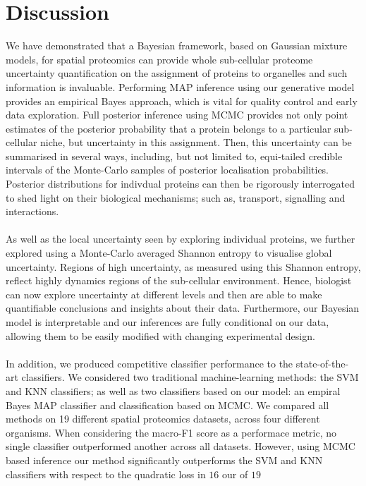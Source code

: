 \documentclass[12pt,english]{article}\usepackage[]{graphicx}\usepackage[]{color}
\begin{document}
\section{Discussion}

We have demonstrated that a Bayesian framework, based on Gaussian
mixture models, for spatial proteomics can provide whole sub-cellular
proteome uncertainty quantification on the assignment of proteins to
organelles and such information is invaluable. Performing MAP
inference using our generative model provides an empirical Bayes
approach, which is vital for quality control and early data
exploration. Full posterior inference using MCMC provides not only
point estimates of the posterior probability that a protein belongs to
a particular sub-cellular niche, but uncertainty in this
assignment. Then, this uncertainty can be summarised in several ways,
including, but not limited to, equi-tailed credible intervals of the
Monte-Carlo samples of posterior localisation probabilities.
Posterior distributions for indivdual proteins can then be rigorously
interrogated to shed light on their biological mechanisms; such as,
transport, signalling and interactions.
\\
\\
As well as the local uncertainty seen by exploring individual
proteins, we further explored using a Monte-Carlo averaged Shannon
entropy to visualise global uncertainty. Regions of high uncertainty,
as measured using this Shannon entropy, reflect highly dynamics
regions of the sub-cellular environment.  Hence, biologist can now
explore uncertainty at different levels and then are able to make
quantifiable conclusions and insights about their data.  Furthermore,
our Bayesian model is interpretable and our inferences are fully
conditional on our data, allowing them to be easily modified with
changing experimental design.
\\
\\
In addition, we produced competitive classifier performance to the
state-of-the-art classifiers. We considered two traditional
machine-learning methods: the SVM and KNN classifiers; as well as two
classifiers based on our model: an empiral Bayes MAP classifier and
classification based on MCMC. We compared all methods on 19 different
spatial proteomics datasets, across four different organisms. When
considering the macro-F1 score as a performace metric, no single
classifier outperformed another across all datasets. However, using
MCMC based inference our method significantly outperforms the SVM and
KNN classifiers with respect to the quadratic loss in $16$ our of $19$
\end{document}

